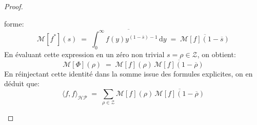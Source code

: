 \documentclass[Riemann_Hypothesis.tex]{subfiles}
\begin{document}
\begin{proof}
\begin{part_proof}
        forme:
        \begin{equation*}
            \mathcal{M}[f^*](s) \;=\; \overline{ \int_{0}^{\infty} f(y)
            y^{(1 - \overline{s}) - 1} \, \mathrm{d}y } \;=\;
            \overline{\mathcal{M}[f](1 - \overline{s})}
        \end{equation*}
        En évaluant cette expression en un zéro non trivial
        $s = \rho \in \mathcal{Z}$, on obtient:
        \begin{equation*}
            \mathcal{M}[\Phi](\rho) \;=\; \mathcal{M}[f](\rho) \,
            \overline{\mathcal{M}[f](1 - \overline{\rho})}
        \end{equation*}
        En réinjectant cette identité dans la somme issue des formules explicites,
        on en déduit que:
        \begin{equation*}
            \langle f, f \rangle_{\mathcal{HP}} \;=\; \sum_{\rho \in \mathcal{Z}}
            \mathcal{M}[f](\rho) \, \overline{\mathcal{M}[f](1 - \overline{\rho})}
        \end{equation*}
    \end{part_proof}


\end{proof}
\end{document}
